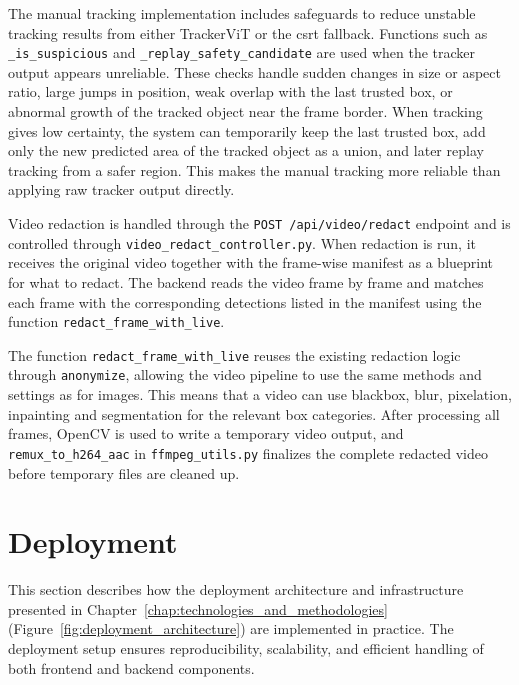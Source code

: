 The manual tracking implementation includes safeguards to reduce unstable tracking results from either TrackerViT or the \acrshort{csrt} fallback. Functions such as \texttt{\_is\_suspicious} and \texttt{\_replay\_safety\_candidate} are used when the tracker output appears unreliable. These checks handle sudden changes in size or aspect ratio, large jumps in position, weak overlap with the last trusted box, or abnormal growth of the tracked object near the frame border. When tracking gives low certainty, the system can temporarily keep the last trusted box, add only the new predicted area of the tracked object as a union, and later replay tracking from a safer region. This makes the manual tracking more reliable than applying raw tracker output directly.


Video redaction is handled through the \texttt{POST /api/video/redact} endpoint and is controlled through \texttt{video\_redact\_controller.py}. When redaction is run, it receives the original video together with the frame-wise manifest as a blueprint for what to redact. The backend reads the video frame by frame and matches each frame with the corresponding detections listed in the manifest using the function \texttt{redact\_frame\_with\_live}.

The function \texttt{redact\_frame\_with\_live} reuses the existing redaction logic through \texttt{anonymize}, allowing the video pipeline to use the same methods and settings as for images. This means that a video can use blackbox, blur, pixelation, \gls{inpainting} and \gls{segmentation} for the relevant box categories. After processing all frames, OpenCV is used to write a temporary video output, and \texttt{remux\_to\_h264\_aac} in \texttt{ffmpeg\_utils.py} finalizes the complete redacted video before temporary files are cleaned up.


\section{Deployment}

This section describes how the deployment architecture and infrastructure presented in Chapter~\ref{chap:technologies_and_methodologies} (Figure~\ref{fig:deployment_architecture}) are implemented in practice. The deployment setup ensures reproducibility, scalability, and efficient handling of both frontend and backend components.


